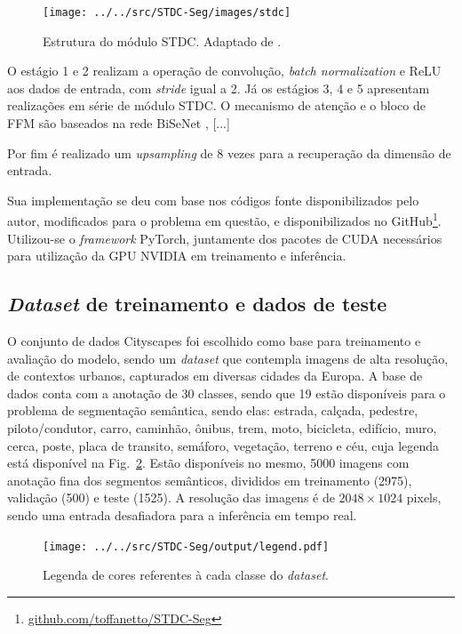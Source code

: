 \documentclass[conference]{IEEEtran}
\begin{document}
\begin{figure}[h!]
	\centering
	\texttt{[image: ../../src/STDC-Seg/images/stdc]}
	\caption{Estrutura do módulo STDC. Adaptado de \cite{fan2021RethinkingBiSeNetRealtime}.}
	\label{fig:stdc}
\end{figure}


O estágio 1 e 2 realizam a operação de convolução, \textit{batch normalization} e ReLU aos dados de entrada, com \textit{stride} igual a 2. Já os estágios 3, 4 e 5 apresentam realizações em série de módulo STDC. O mecanismo de atenção e o bloco de FFM são baseados na rede BiSeNet \cite{yu2018BiSeNetBilateralSegmentation}, [...]

Por fim é realizado um \textit{upsampling} de 8 vezes para a recuperação da dimensão de entrada.

Sua implementação se deu com base nos códigos fonte disponibilizados pelo autor, modificados para o problema em questão, e disponibilizados no GitHub\footnote{\href{https://github.com/toffanetto/STDC-Seg}{github.com/toffanetto/STDC-Seg}}. Utilizou-se o \textit{framework} PyTorch, juntamente dos pacotes de CUDA necessários para utilização da GPU NVIDIA em treinamento e inferência.


\subsection{\textit{Dataset} de treinamento e dados de teste}

O conjunto de dados Cityscapes \cite{cordts2016CityscapesDatasetSemantic} foi escolhido como base para treinamento e avaliação do modelo, sendo um \textit{dataset} que contempla imagens de alta resolução, de contextos urbanos, capturados em diversas cidades da Europa. A base de dados conta com a anotação de 30 classes, sendo que 19 estão disponíveis para o problema de segmentação semântica, sendo elas: estrada, calçada, pedestre, piloto/condutor, carro, caminhão, ônibus, trem, moto, bicicleta, edifício, muro, cerca, poste, placa de transito, semáforo, vegetação, terreno e céu, cuja legenda está disponível na Fig.~\ref{fig:legend}. Estão disponíveis no mesmo, 5000 imagens com anotação fina dos segmentos semânticos, divididos em treinamento (2975), validação (500) e teste (1525). A resolução das imagens é de $2048 \times 1024$ pixels, sendo uma entrada desafiadora para a inferência em tempo real.

\begin{figure}[h!]
	\centering
	\texttt{[image: ../../src/STDC-Seg/output/legend.pdf]}
	\caption{Legenda de cores referentes à cada classe do \textit{dataset}.}
	\label{fig:legend}
\end{figure}
\end{document}
